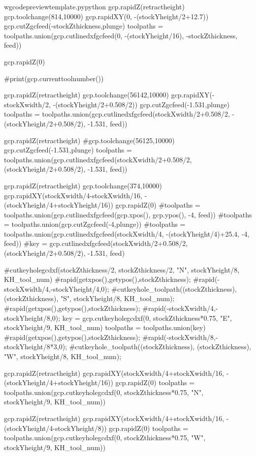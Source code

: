 \documentclass{ltxdoc}
\begin{document}
\begin{writecode}{w}{gcodepreviewtemplate.py}{python}
gcp.rapidZ(retractheight)
gcp.toolchange(814,10000)
gcp.rapidXY(0, -(stockYheight/2+12.7))
gcp.cutZgcfeed(-stockZthickness,plunge)
toolpaths = toolpaths.union(gcp.cutlinedxfgcfeed(0, -(stockYheight/16), -stockZthickness, feed))


gcp.rapidZ(0)

#print(gcp.currenttoolnumber())

gcp.rapidZ(retractheight)
gcp.toolchange(56142,10000)
gcp.rapidXY(-stockXwidth/2, -(stockYheight/2+0.508/2))
gcp.cutZgcfeed(-1.531,plunge)
toolpaths = toolpaths.union(gcp.cutlinedxfgcfeed(stockXwidth/2+0.508/2, -(stockYheight/2+0.508/2), -1.531, feed))

gcp.rapidZ(retractheight)
#gcp.toolchange(56125,10000)
gcp.cutZgcfeed(-1.531,plunge)
toolpaths = toolpaths.union(gcp.cutlinedxfgcfeed(stockXwidth/2+0.508/2, (stockYheight/2+0.508/2), -1.531, feed))

gcp.rapidZ(retractheight)
gcp.toolchange(374,10000)
gcp.rapidXY(stockXwidth/4-stockXwidth/16, -(stockYheight/4+stockYheight/16))
gcp.rapidZ(0)
#toolpaths = toolpaths.union(gcp.cutlinedxfgcfeed(gcp.xpos(), gcp.ypos(), -4, feed))
#toolpaths = toolpaths.union(gcp.cutZgcfeed(-4,plunge))
#toolpaths = toolpaths.union(gcp.cutlinedxfgcfeed(stockXwidth/4, -(stockYheight/4)+25.4, -4, feed))
#key = gcp.cutlinedxfgcfeed(stockXwidth/2+0.508/2, (stockYheight/2+0.508/2), -1.531, feed)

#cutkeyholegcdxf(stockZthickness/2, stockZthickness/2, "N", stockYheight/8, KH_tool_num)
#rapid(getxpos(),getypos(),stockZthickness);
#rapid(-stockXwidth/4,-stockYheight/4,0);
#cutkeyhole_toolpath((stockZthickness), (stockZthickness), "S", stockYheight/8, KH_tool_num);
#rapid(getxpos(),getypos(),stockZthickness);
#rapid(-stockXwidth/4,-stockYheight/8,0);
key = gcp.cutkeyholegcdxf(0, stockZthickness*0.75, "E", stockYheight/9, KH_tool_num)
toolpaths = toolpaths.union(key)
#rapid(getxpos(),getypos(),stockZthickness);
#rapid(-stockXwidth/8,-stockYheight/8*3,0);
#cutkeyhole_toolpath((stockZthickness), (stockZthickness), "W", stockYheight/8, KH_tool_num);

gcp.rapidZ(retractheight)
gcp.rapidXY(stockXwidth/4+stockXwidth/16, -(stockYheight/4+stockYheight/16))
gcp.rapidZ(0)
toolpaths = toolpaths.union(gcp.cutkeyholegcdxf(0, stockZthickness*0.75, "N", stockYheight/9, KH_tool_num))

gcp.rapidZ(retractheight)
gcp.rapidXY(stockXwidth/4+stockXwidth/16, -(stockYheight/4-stockYheight/8))
gcp.rapidZ(0)
toolpaths = toolpaths.union(gcp.cutkeyholegcdxf(0, stockZthickness*0.75, "W", stockYheight/9, KH_tool_num))


\end{writecode}
\end{document}

